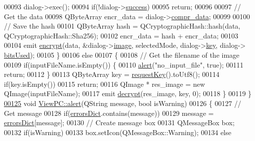 \begin{DoxyCode}
00093         dialog->exec();
00094         \textcolor{keywordflow}{if}(!dialog->\hyperlink{class_encrypt_dialog_ada4900bcd40894d9c098c65aa4066ac9}{success})
00095             \textcolor{keywordflow}{return};
00096 
00097         \textcolor{comment}{// Get the data}
00098         QByteArray encr\_data = dialog->\hyperlink{class_encrypt_dialog_a3e8998aa39696cbd1242f6420ef18143}{compr\_data};
00099 
00100         \textcolor{comment}{// Save the hash}
00101         QByteArray hash = QCryptographicHash::hash(data, QCryptographicHash::Sha256);
00102         encr\_data = hash + encr\_data;
00103 
00104         emit \hyperlink{class_view_p_c_aaab3c809a069aed248ef7100daabf8ee}{encrypt}(data, &dialog->\hyperlink{class_encrypt_dialog_a739a0df1d28d06b28a3fd16e2bc16c73}{image}, selectedMode, dialog->\hyperlink{class_encrypt_dialog_a1afdef3c665fb0d0fae06d1df8e84951}{key}, dialog->
      \hyperlink{class_encrypt_dialog_abf638fea37fbdbaba215954e2e239860}{bitsUsed});
00105     \}
00106     \textcolor{keywordflow}{else}
00107     \{
00108         \textcolor{comment}{// Get the filename of the image}
00109         \textcolor{keywordflow}{if}(inputFileName.isEmpty()) \{
00110             \hyperlink{class_view_p_c_a7c467169467789561078abc9d4fe57bd}{alert}(\textcolor{stringliteral}{"no\_input\_file"}, \textcolor{keyword}{true});
00111             \textcolor{keywordflow}{return};
00112         \}
00113         QByteArray key = \hyperlink{class_view_p_c_a559c95675ec98b15451f3bca47033d9c}{requestKey}().toUtf8();
00114         \textcolor{keywordflow}{if}(key.isEmpty())
00115             \textcolor{keywordflow}{return};
00116         QImage * res\_image = \textcolor{keyword}{new} QImage(inputFileName);
00117         emit \hyperlink{class_view_p_c_a365df051360d557c7221474ad856e0af}{decrypt}(res\_image, key, 0);
00118     \}
00119 \}
\hypertarget{viewpc_8cpp_source.tex_l00125}{}\hyperlink{class_view_p_c_a7c467169467789561078abc9d4fe57bd}{00125} \textcolor{keywordtype}{void} \hyperlink{class_view_p_c_a7c467169467789561078abc9d4fe57bd}{ViewPC::alert}(QString message, \textcolor{keywordtype}{bool} isWarning)
00126 \{
00127     \textcolor{comment}{// Get message}
00128     \textcolor{keywordflow}{if}(\hyperlink{class_view_p_c_aaf7f058e5589d65fec72a21abfd5629b}{errorsDict}.contains(message))
00129         message = \hyperlink{class_view_p_c_aaf7f058e5589d65fec72a21abfd5629b}{errorsDict}[message];
00130     \textcolor{comment}{// Create message box}
00131     QMessageBox box;
00132     \textcolor{keywordflow}{if}(isWarning)
00133         box.setIcon(QMessageBox::Warning);
00134     \textcolor{keywordflow}{else}

\end{DoxyCode}
